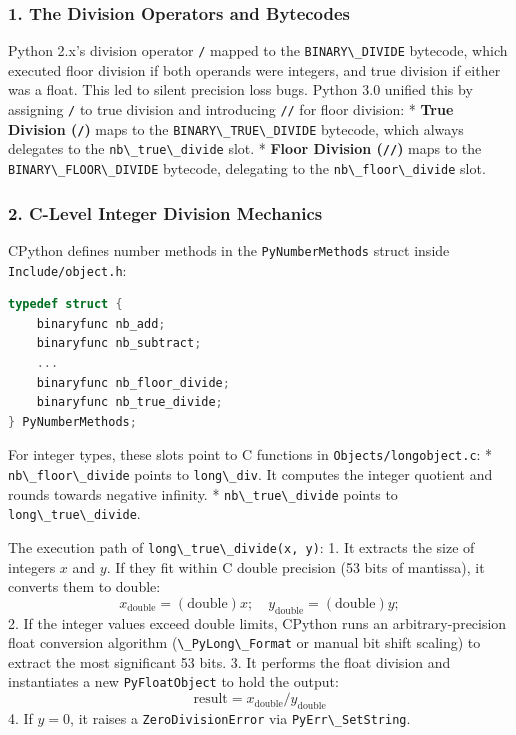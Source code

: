 \hypertarget{the-division-operators-and-bytecodes}{%
\subsubsection{1. The Division Operators and
Bytecodes}\label{the-division-operators-and-bytecodes}}

Python 2.x's division operator \passthrough{\lstinline!/!} mapped to the
\passthrough{\lstinline!BINARY\_DIVIDE!} bytecode, which executed floor
division if both operands were integers, and true division if either was
a float. This led to silent precision loss bugs. Python 3.0 unified this
by assigning \passthrough{\lstinline!/!} to true division and
introducing \passthrough{\lstinline!//!} for floor division: *
\textbf{True Division (\passthrough{\lstinline!/!})} maps to the
\passthrough{\lstinline!BINARY\_TRUE\_DIVIDE!} bytecode, which always
delegates to the \passthrough{\lstinline!nb\_true\_divide!} slot. *
\textbf{Floor Division (\passthrough{\lstinline!//!})} maps to the
\passthrough{\lstinline!BINARY\_FLOOR\_DIVIDE!} bytecode, delegating to
the \passthrough{\lstinline!nb\_floor\_divide!} slot.

\hypertarget{c-level-integer-division-mechanics}{%
\subsubsection{2. C-Level Integer Division
Mechanics}\label{c-level-integer-division-mechanics}}

CPython defines number methods in the
\passthrough{\lstinline!PyNumberMethods!} struct inside
\passthrough{\lstinline!Include/object.h!}:

\begin{lstlisting}[language=C]
typedef struct {
    binaryfunc nb_add;
    binaryfunc nb_subtract;
    ...
    binaryfunc nb_floor_divide;
    binaryfunc nb_true_divide;
} PyNumberMethods;
\end{lstlisting}

For integer types, these slots point to C functions in
\passthrough{\lstinline!Objects/longobject.c!}: *
\passthrough{\lstinline!nb\_floor\_divide!} points to
\passthrough{\lstinline!long\_div!}. It computes the integer quotient
and rounds towards negative infinity. *
\passthrough{\lstinline!nb\_true\_divide!} points to
\passthrough{\lstinline!long\_true\_divide!}.

The execution path of
\passthrough{\lstinline!long\_true\_divide(x, y)!}: 1. It extracts the
size of integers \(x\) and \(y\). If they fit within C double precision
(53 bits of mantissa), it converts them to double:
\[x_{\text{double}} = (\text{double})x; \quad y_{\text{double}} = (\text{double})y;\]
2. If the integer values exceed double limits, CPython runs an
arbitrary-precision float conversion algorithm
(\passthrough{\lstinline!\_PyLong\_Format!} or manual bit shift scaling)
to extract the most significant 53 bits. 3. It performs the float
division and instantiates a new \passthrough{\lstinline!PyFloatObject!}
to hold the output:
\[\text{result} = x_{\text{double}} / y_{\text{double}}\] 4. If
\(y = 0\), it raises a \passthrough{\lstinline!ZeroDivisionError!} via
\passthrough{\lstinline!PyErr\_SetString!}.

